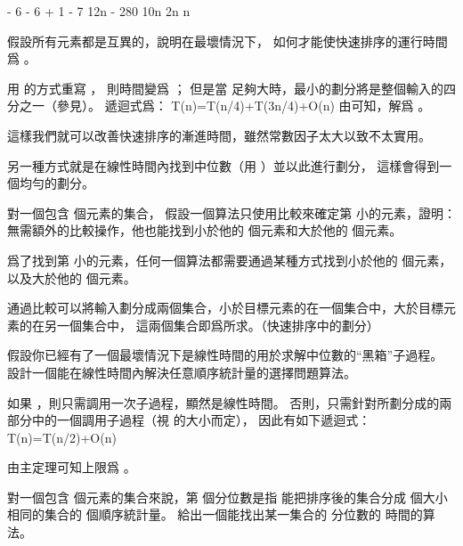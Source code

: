 \startANSWER
\startformula\startmathalignment[n=1]
\NC {} - 6 \ge \lceil {} \rceil \NR
\NC \Downarrow \NR
\NC {} - 6 \ge {} + 1 \NR
\NC \Downarrow \NR
\NC {} - 7 \ge {} \NR
\NC \Downarrow \NR
\NC 12n - 280 \ge 10n \NR
\NC \Downarrow \NR
\NC 2n  \NR
\NC \Downarrow \NR
\NC n  \NR
\stopmathalignment\stopformula
\stopANSWER

\startEXERCISE
假設所有元素都是互異的，說明在最壞情況下，
如何才能使快速排序的運行時間爲 。
\stopEXERCISE

\startANSWER
用  的方式重寫 ，
則時間變爲 ；
但是當  足夠大時，最小的劃分將是整個輸入的四分之一（參見\inexercise[partition_1_4]）。
遞迴式爲：
\startformula
T(n)=T(n/4)+T(3n/4)+O(n)
\stopformula
由 可知，解爲 。

這樣我們就可以改善快速排序的漸進時間，雖然常數因子太大以致不太實用。

另一種方式就是在線性時間內找到中位數（用 ）並以此進行劃分，
這樣會得到一個均勻的劃分。
\stopANSWER

\startEXERCISE\DIFFICULT
對一個包含  個元素的集合，
假設一個算法只使用比較來確定第  小的元素，證明：
無需額外的比較操作，他也能找到小於他的  個元素和大於他的  個元素。
\stopEXERCISE

\startANSWER
爲了找到第  小的元素，任何一個算法都需要通過某種方式找到小於他的  個元素，
以及大於他的  個元素。

通過比較可以將輸入劃分成兩個集合，小於目標元素的在一個集合中，大於目標元素的在另一個集合中，
這兩個集合即爲所求。（快速排序中的劃分）
\stopANSWER

\startEXERCISE
假設你已經有了一個最壞情況下是線性時間的用於求解中位數的“黑箱”子過程。
設計一個能在線性時間內解決任意順序統計量的選擇問題算法。
\stopEXERCISE

\startANSWER
如果 ，則只需調用一次子過程，顯然是線性時間。
否則，只需針對所劃分成的兩部分中的一個調用子過程（視  的大小而定），
因此有如下遞迴式：
\startformula
T(n)=T(n/2)+O(n)
\stopformula

由主定理可知上限爲 。
\stopANSWER

\startEXERCISE
對一個包含  個元素的集合來說，第  個{\EMP 分位數}是指
能把排序後的集合分成  個大小相同的集合的  個順序統計量。
給出一個能找出某一集合的  分位數的  時間的算法。
\stopEXERCISE

